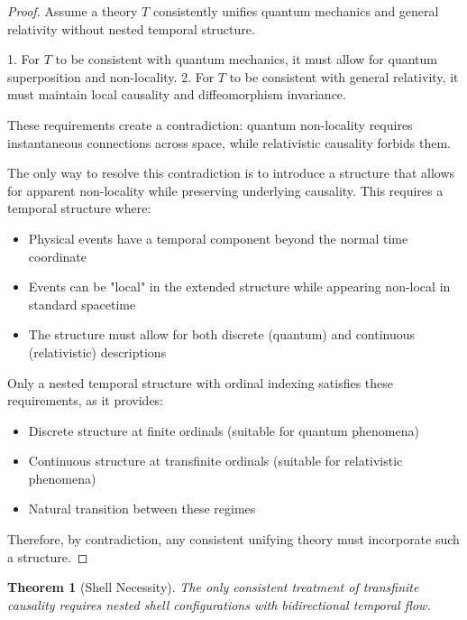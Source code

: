 \documentclass[12pt,a4paper]{article}
\newtheorem{theorem}{Theorem}[section]
\begin{document}
\begin{proof}
Assume a theory $T$ consistently unifies quantum mechanics and general relativity without nested temporal structure.

1. For $T$ to be consistent with quantum mechanics, it must allow for quantum superposition and non-locality.
2. For $T$ to be consistent with general relativity, it must maintain local causality and diffeomorphism invariance.

These requirements create a contradiction: quantum non-locality requires instantaneous connections across space, while relativistic causality forbids them.

The only way to resolve this contradiction is to introduce a structure that allows for apparent non-locality while preserving underlying causality. This requires a temporal structure where:
\begin{itemize}
    \item Physical events have a temporal component beyond the normal time coordinate
    \item Events can be "local" in the extended structure while appearing non-local in standard spacetime
    \item The structure must allow for both discrete (quantum) and continuous (relativistic) descriptions
\end{itemize}

Only a nested temporal structure with ordinal indexing satisfies these requirements, as it provides:
\begin{itemize}
    \item Discrete structure at finite ordinals (suitable for quantum phenomena)
    \item Continuous structure at transfinite ordinals (suitable for relativistic phenomena)
    \item Natural transition between these regimes
\end{itemize}

Therefore, by contradiction, any consistent unifying theory must incorporate such a structure.
\end{proof}

\begin{theorem}[Shell Necessity]
\label{thm:shell-necessity}
The only consistent treatment of transfinite causality requires nested shell configurations with bidirectional temporal flow.
\end{theorem}
\end{document}
